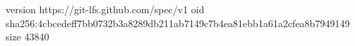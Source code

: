 version https://git-lfs.github.com/spec/v1
oid sha256:4cbcedeff7bb0732b3a8289db211ab7149c7b4ea81ebb1a61a2cfea8b7949149
size 43840
